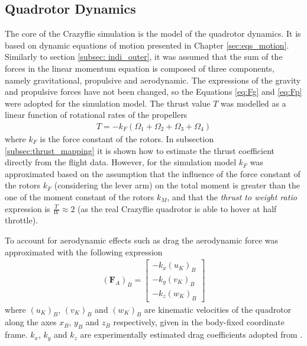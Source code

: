 \documentclass[11pt, a4paper, twoside]{report}
\begin{document}
\subsection{Quadrotor Dynamics} \label{subsec:quadrotor_dynamics}

The core of the Crazyflie simulation is the model of the quadrotor dynamics. It is based on dynamic equations of motion presented in Chapter \ref{sec:eqs_motion}. Similarly to section \ref{subsec: indi_outer}, it was assumed that the sum of the forces in the linear momentum equation is composed of three components, namely gravitational, propulsive and aerodynamic. The expressions of the gravity and propulsive forces have not been changed, so the Equations \ref{eq:Fg} and \ref{eq:Fp} were adopted for the simulation model. The thrust value $T$ was modelled as a linear function of rotational rates of the propellers 
\begin{equation}
	\begin{split}
		T = - k_F (\Omega_1 + \Omega_2 + \Omega_3 + \Omega_4)
		\label{eq:thrust}
	\end{split}
\end{equation}
where $k_F$ is the force constant of the rotors. In subsection \ref{subsec:thrust_mapping} it is shown how to estimate the thrust coefficient directly from the flight data. However, for the simulation model $k_F$ was approximated based on the assumption that the influence of the force constant of the rotors $k_F$ (considering the lever arm) on the total moment is greater than the one of the moment constant of the rotors $k_M$, and that the \textit{thrust to weight ratio} expression is $\frac{T}{W} \approx 2$ (as the real Crazyflie quadrotor is able to hover at half throttle).

To account for aerodynamic effects such as drag the aerodynamic force was approximated with the following expression 
\begin{equation}
	\begin{split}
		(\bm{F}_A)_B =  
		\begin{bmatrix}
			-k_x (u_K)_B\\
			-k_y (v_K)_B\\
			-k_z (w_K)_B
		\end{bmatrix}
		\label{eq:Fa_simulink}
	\end{split}
\end{equation}
where $(u_K)_B$, $(v_K)_B$ and $(w_K)_B$ are kinematic velocities of the quadrotor along the axes $x_B$, $y_B$ and $z_B$ respectively, given in the body-fixed coordinate frame. $k_x$, $k_y$ and $k_z$ are experimentally estimated drag coefficients adopted from \cite{foerster}.
\end{document}
